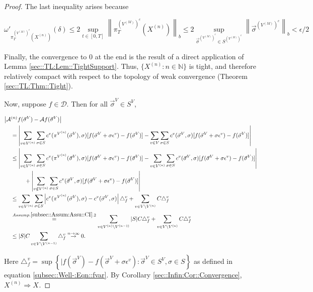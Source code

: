 \documentclass[12pt]{article}
\newcommand{\mb}{\mathbb}
\newcommand{\mc}{\mathcal}
\newcommand{\ra}{\rightarrow}
\newcommand{\os}{\overset}
\newcommand{\ep}{\epsilon}
\newcommand{\ind}{\hspace{24pt}}
\renewcommand{\v}{v}							%
\renewcommand{\S}{S}							%
\newcommand{\s}{\sigma}							%
\newcommand{\sv}{\vec{\s}}						%
\renewcommand{\b}{b}							%
\newcommand{\ev}{\ep}							%
\newcommand{\T}{T}								%
\renewcommand{\t}{t}							%
\newcommand{\proj}{\pi}							%
\newcommand{\X}{X}								%
\newcommand{\IG}{\mc{A}}						%
\newcommand{\IGr}{c}							%
\newcommand{\f}{f}								%
\newcommand{\vind}[1]{^{#1}}					%
\newcommand{\carp}[1]{^{#1}}					%
\newcommand{\vsi}[1]{^{#1}}						%
\newcommand{\cind}[1]{_{#1}}					%
\newcommand{\tip}[1]{#1}						%
\newcommand{\ts}[1]{_{#1}}						%
\newcommand{\const}{C}							%
\newcommand{\sln}[1]{^{(#1)}}						%
\newcommand{\core}{\mc{D}}						%
\newcommand{\delt}{\triangle}					%
\newcommand{\cconst}{M}							%
\newcommand{\cmodu}{\omega'}					%
\newcommand{\deltf}[1]{_{#1}}					%
\newcommand{\pra}[1]{_{#1}}						%
\newcommand{\indx}[1]{_{#1}}					%
\begin{document}
\begin{proof}
The last inequality arises because

\[\cmodu\pra{\proj\vsi{\left(V\sln{\cconst}\right)^c}\ts{\T}(\X\sln{n}\cind{}\tip{})}(\delta) \leq 2 \sup_{\t\in [0,\T]} \left\|\proj\vsi{\left(V\sln{\cconst}\right)^c}\ts{\T}(\X\sln{n}\cind{}\tip{})\right\|_{\b} \leq 2 \sup_{\sv\cind{}\vsi{\left(V\sln{\cconst}\right)^c} \in \S\carp{\left(V\sln{\cconst}\right)^c}} \left\|\sv\cind{}\vsi{\left(V\sln{\cconst}\right)^c}\right\|_{\b} < \ep/2\]

Finally, the convergence to 0 at the end is the result of a direct application of Lemma \ref{sec::TL:Lem::TightSupport}. Thus, \(\{\X\sln{n}\cind{}\tip{}:n\in \mb{N}\}\) is tight, and therefore relatively compact with respect to the topology of weak convergence (Theorem \ref{sec::TL:Thm::Tight}).

Now, suppose \(f\in \core\). Then for all \(\sv\cind{}\vsi{V} \in \S\carp{V}\),

\begin{align*}
\big|\IG&\sln{n}f(\sv\cind{}\vsi{V}) - \IG f(\sv\cind{}\vsi{V})\big|\\
&= \left|\sum_{\v \in V\sln{n}} \sum_{\s \in \S} \IGr\vind{\v}(\proj\vsi{V\sln{n}}\ts{}(\sv\cind{}\vsi{V}),\s)[f(\sv\cind{}\vsi{V}+\s\ev\vind{\v}) - f(\sv\cind{}\vsi{V})] - \sum_{\v \in V}\sum_{\s \in \S} \IGr\vind{\v}(\sv\cind{}\vsi{V},\s)[f(\sv\cind{}\vsi{V}+\s\ev\vind{\v}) - f(\sv\cind{}\vsi{V})]\right|\\
&\leq  \left|\sum_{\v \in V\sln{n}} \sum_{\s \in \S} \IGr\vind{\v}(\proj\vsi{V\sln{n}}\ts{}(\sv\cind{}\vsi{V}),\s)[f(\sv\cind{}\vsi{V}+\s\ev\vind{\v}) - f(\sv\cind{}\vsi{V})] - \sum_{\v \in V\sln{n}}\sum_{\s \in \S} \IGr\vind{\v}(\sv\cind{}\vsi{V},\s)[f(\sv\cind{}\vsi{V}+\s\ev\vind{\v}) - f(\sv\cind{}\vsi{V})]\right|\\
&\ind  +\left|\sum_{\v \notin V\sln{n}} \sum_{\s\in \S} \IGr\vind{\v}(\sv\cind{}\vsi{V},\s)[f(\sv\cind{}\vsi{V}+\s\ev\vind{\v}) - f(\sv\cind{}\vsi{V})]\right|\\
&\leq \sum_{\v \in V\sln{n}}\sum_{\s \in \S} \left|\IGr\vind{\v}(\proj\vsi{V\sln{n}}\ts{}(\sv\cind{}\vsi{V}),\s) - \IGr\vind{\v}(\sv\cind{}\vsi{V},\s)\right|\delt\deltf{\f}\vind{\v} + \sum_{\v \in V\setminus V\sln{n}} \const\indx{}\delt\deltf{\f}\vind{\v}\\
&\os{Assump. \ref{subsec::Assum:Assu::CI}.2}{=} \sum_{\v \in V\sln{n}\setminus V\sln{n-1}} |\S|\const\indx{} \delt\deltf{\f}\vind{\v} + \sum_{\v \in V\setminus V\sln{n}} \const\indx{}\delt\deltf{\f}\vind{\v}\\
&\leq |\S|C\sum_{\v \in V\setminus V\sln{n-1}} \delt\deltf{\f}\vind{\v} \os{n\ra\infty}{\ra} 0.
\end{align*}

Here \(\delt\deltf{\f}\vind{\v} = \sup\left\{|f(\sv\cind{}\vsi{V}) - f(\sv\cind{}\vsi{V} + \s\ev\vind{\v}): \sv\cind{}\vsi{V}\in \S\carp{V},\s \in \S\right\}\) as defined in equation \eqref{subsec::Well-:Eqn::fvar}. By Corollary \ref{sec::Infin:Cor::Convergence}, \(\X\sln{n}\cind{}\tip{}\Rightarrow \X\cind{}\tip{}\).
\end{proof}
\end{document}
